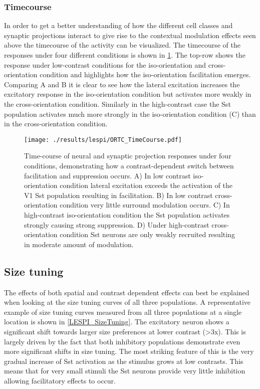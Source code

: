 \subsubsection{Timecourse}

In order to get a better understanding of how the different cell
classes and synaptic projections interact to give rise to the
contextual modulation effects seen above the timecourse of the
activity can be visualized. The timecourse of the responses under four
different conditions is shown in \ref{ORTC_TimeCourse}. The top-row
shows the response under low-contrast conditions for the
iso-orientation and cross-orientation condition and highlights how the
iso-orientation facilitation emerges. Comparing A and B it is clear to
see how the lateral excitation increases the excitatory response in
the iso-orientation condition but activates more weakly in the
cross-orientation condition. Similarly in the high-contrast case the
Sst population activates much more strongly in the iso-orientation
condition (C) than in the cross-orientation condition.

\begin{figure}
	\centering
        \texttt{[image: ./results/lespi/ORTC\_TimeCourse.pdf]}
	\caption[Time-course of neural and synaptic projection responses
      under four conditions, demonstrating how a contrast-dependent
      switch between facilitation and suppression occurs]{Time-course
      of neural and synaptic projection responses under four
      conditions, demonstrating how a contrast-dependent switch
      between facilitation and suppression occurs. A) In low contrast
      iso-orientation condition lateral excitation exceeds the
      activation of the V1 Sst population resulting in
      facilitation. B) In low contrast cross-orientation condition
      very little surround modulation occurs. C) In high-contrast
      iso-orientation condition the Sst population activates strongly
      causing strong suppression. D) Under high-contrast
      cross-orientation condition Sst neurons are only weakly
      recruited resulting in moderate amount of modulation.}
	\label{ORTC_TimeCourse}
\end{figure}

\subsection{Size tuning}

The effects of both spatial and contrast dependent effects can best be
explained when looking at the size tuning curves of all three
populations. A representative example of size tuning curves measured
from all three populations at a single location is shown in
\ref{LESPI_SizeTuning}. The excitatory neuron shows a significant
shift towards larger size preferences at lower contrast (>3x). This is
largely driven by the fact that both inhibitory populations
demonstrate even more significant shifts in size tuning. The most
striking feature of this is the very gradual increase of Sst
activation as the stimulus grows at low contrasts. This means that for
very small stimuli the Sst neurons provide very little inhibition
allowing facilitatory effects to occur.

